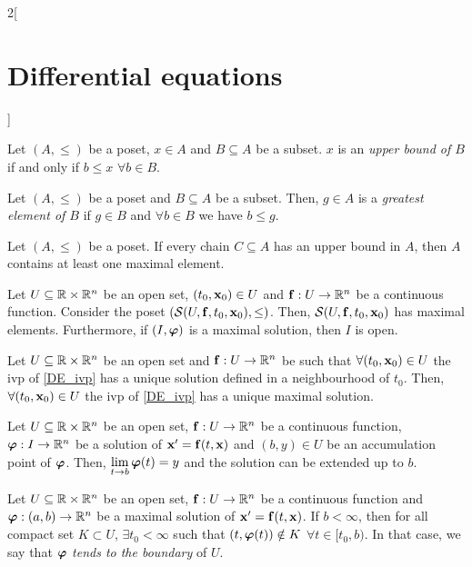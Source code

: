\documentclass[../../../main.tex]{subfiles}
\begin{document}
\begin{multicols}{2}[\section{Differential equations}]
\begin{definition}
  \end{definition}
  \begin{definition}
    Let $(A,\leq )$ be a poset, $x\in A$ and $B\subseteq A$ be a subset. $x$ is an \textit{upper bound of $B$} if and only if $b\leq x$ $\forall b\in B$.
  \end{definition}
  \begin{definition}
    Let $(A,\leq )$ be a poset and $B\subseteq A$ be a subset. Then, $g\in A$ is a \textit{greatest element of $B$} if $g\in B$ and $\forall b\in B$ we have $b \leq  g$.
  \end{definition}
  \begin{lemma}
    Let $(A,\leq )$ be a poset. If every chain $C\subseteq A$ has an upper bound in $A$, then $A$ contains at least one maximal element.
  \end{lemma}
  \begin{theorem}
    Let $U\subseteq\mathbb{R}\times\mathbb{R}^n$ be an open set, $(t_0,\boldsymbol{\mathrm{x}}_0)\in U$ and $\boldsymbol{\mathrm{f}}:U\rightarrow\mathbb{R}^n$ be a continuous function. Consider the poset $(\mathcal{S}(U,\boldsymbol{\mathrm{f}},t_0,\boldsymbol{\mathrm{x}}_0),\leq)$. Then, $\mathcal{S}(U,\boldsymbol{\mathrm{f}},t_0,\boldsymbol{\mathrm{x}}_0)$ has maximal elements. Furthermore, if $(I,\boldsymbol{\mathrm{\varphi}})$ is a maximal solution, then $I$ is open.
  \end{theorem}
  \begin{prop}
    Let $U\subseteq\mathbb{R}\times\mathbb{R}^n$ be an open set and $\boldsymbol{\mathrm{f}}:U\rightarrow\mathbb{R}^n$ be such that $\forall(t_0,\boldsymbol{\mathrm{x}}_0)\in U$ the ivp of \cref{DE_ivp} has a unique solution defined in a neighbourhood of $t_0$. Then, $\forall(t_0,\boldsymbol{\mathrm{x}}_0)\in U$ the ivp of \cref{DE_ivp} has a unique maximal solution.
  \end{prop}
  \begin{lemma}
    Let $U\subseteq\mathbb{R}\times\mathbb{R}^n$ be an open set, $\boldsymbol{\mathrm{f}}:U\rightarrow\mathbb{R}^n$ be a continuous function, $\boldsymbol{\mathrm{\varphi}}:I\rightarrow\mathbb{R}^n$ be a solution of $\boldsymbol{\mathrm{x}}'=\boldsymbol{\mathrm{f}}(t,\boldsymbol{\mathrm{x}})$ and $(b,y)\in U$ be an accumulation point of $\boldsymbol{\mathrm{\varphi}}$. Then, $\displaystyle\lim_{t\to b}\boldsymbol{\mathrm{\varphi}}(t)=y$ and the solution can be extended up to $b$.
  \end{lemma}
  \begin{corollary}
    Let $U\subseteq\mathbb{R}\times\mathbb{R}^n$ be an open set, $\boldsymbol{\mathrm{f}}:U\rightarrow\mathbb{R}^n$ be a continuous function and $\boldsymbol{\mathrm{\varphi}}:(a,b)\rightarrow\mathbb{R}^n$ be a maximal solution of $\boldsymbol{\mathrm{x}}'=\boldsymbol{\mathrm{f}}(t,\boldsymbol{\mathrm{x}})$. If $b<\infty$, then for all compact set $K\subset U$, $\exists t_0<\infty$ such that $(t,\boldsymbol{\mathrm{\varphi}}(t))\notin K$ $\forall t\in[t_0,b)$. In that case, we say that $\boldsymbol{\mathrm{\varphi}}$ \textit{tends to the boundary} of $U$.
  \end{corollary}

\end{multicols}
\end{document}
